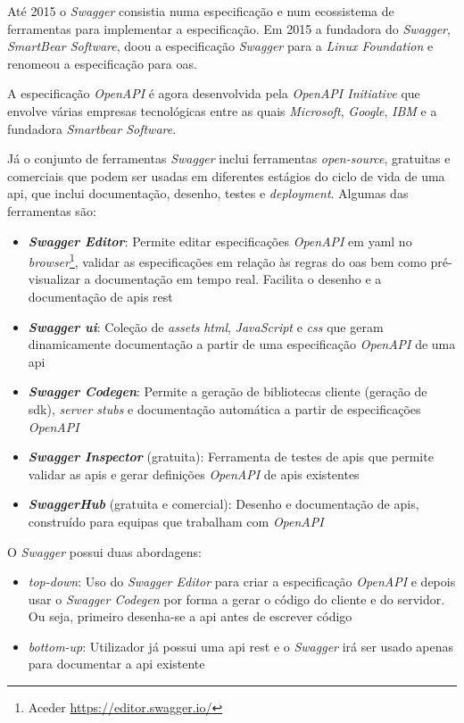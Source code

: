 Até 2015 o \textit{Swagger} consistia numa especificação e num ecossistema de ferramentas para implementar a especificação. Em 2015 a fundadora do \textit{Swagger}, \textit{SmartBear Software}, doou a especificação \textit{Swagger} para a \textit{Linux Foundation} e renomeou a especificação para \acrlong{oas}.~\cite{wiswagger}

A especificação \textit{OpenAPI} é agora desenvolvida pela \textit{OpenAPI Initiative} que envolve várias empresas tecnológicas entre as quais \textit{Microsoft}, \textit{Google}, \textit{IBM} e a fundadora \textit{Smartbear Software}.

Já o conjunto de ferramentas \textit{Swagger} inclui ferramentas \textit{open-source}, gratuitas e comerciais que podem ser usadas em diferentes estágios do ciclo de vida de uma \acrshort{api}, que inclui documentação, desenho, testes e \textit{deployment}. Algumas das ferramentas são:~\cite{swaggerVSoas}
\begin{itemize}
    \item \textbf{\textit{Swagger Editor}}: Permite editar especificações \textit{OpenAPI} em \acrshort{yaml} no \textit{browser}\footnote{Aceder \url{https://editor.swagger.io/}}, validar as especificações em relação às regras do \acrshort{oas} bem como pré-visualizar a documentação em tempo real. Facilita o desenho e a documentação de \acrshort{api}s \acrshort{rest}
    \item \textbf{\textit{Swagger \acrshort{ui}}}: Coleção de \textit{assets} \textit{\acrshort{html}}, \textit{JavaScript} e \textit{\acrshort{css}} que geram dinamicamente documentação a partir de uma especificação \textit{OpenAPI} de uma \acrshort{api}
    \item \textbf{\textit{Swagger Codegen}}: Permite a geração de bibliotecas cliente (geração de \acrshort{sdk}), \textit{server stubs} e documentação automática a partir de especificações \textit{OpenAPI}
    \item \textbf{\textit{Swagger Inspector}} (gratuita): Ferramenta de testes de \acrshort{api}s que permite validar as \acrshort{api}s e gerar definições \textit{OpenAPI} de \acrshort{api}s existentes
    \item \textbf{\textit{SwaggerHub}} (gratuita e comercial): Desenho e documentação de \acrshort{api}s, construído para equipas que trabalham com \textit{OpenAPI}
\end{itemize}

O \textit{Swagger} possui duas abordagens:~\cite{swaggerNode}
\begin{itemize}
    \item \textit{top-down}: Uso do \textit{Swagger Editor} para criar a especificação \textit{OpenAPI} e depois usar o \textit{Swagger Codegen} por forma a gerar o código do cliente e do servidor. Ou seja, primeiro desenha-se a \acrshort{api} antes de escrever código
    \item \textit{bottom-up}: Utilizador já possui uma \acrshort{api} \acrshort{rest} e o \textit{Swagger} irá ser usado apenas para documentar a \acrshort{api} existente
\end{itemize}

